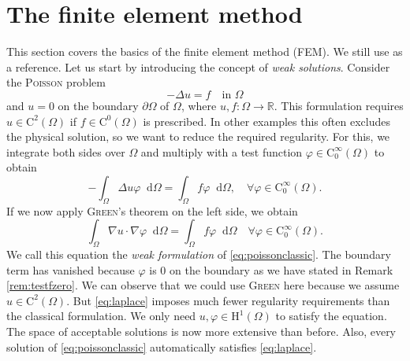 \documentclass[12pt,a4paper,twoside, open=right]{scrreprt}
\theoremstyle{definition}
\theoremstyle{plain}
\newcommand{\rr}{\mathbb{R}}
\newcommand{\D}{\mathop{}\!\mathrm{d}}
\begin{document}
\section{The finite element method}
\label{sec:fem}
This section covers the basics of the finite element method (FEM). We still use \cite{Ganesan2017} as a reference.
Let us start by introducing the concept of \emph{weak solutions}. Consider the \textsc{Poisson} problem
\begin{equation}
\label{eq:poissonclassic}
    -\Delta u = f \quad \text{in }\Omega
\end{equation}
and $u=0$ on the boundary $\partial\Omega$ of $\Omega$, where $u,f\colon \Omega\to\rr$. This formulation requires $u\in \mathrm{C}^2(\Omega)$ if $f\in\mathrm{C}^0(\Omega)$ is prescribed. In other examples this often excludes the physical solution, so we want to reduce the required regularity. For this, we integrate both sides over $\Omega$ and multiply with a test function $\varphi\in \mathrm{C}^\infty_0(\Omega)$ to obtain
\begin{equation}
    -\int_\Omega \Delta u\varphi\D\Omega =\int_\Omega f\varphi\D\Omega,\quad\forall\varphi\in\mathrm{C}^\infty_0(\Omega).
\end{equation}
If we now apply \textsc{Green}'s theorem on the left side, we obtain
\begin{equation}
    \int_\Omega \nabla u\cdot\nabla \varphi\D\Omega = \int_\Omega f\varphi\D\Omega \quad\forall\varphi\in \mathrm{C}^\infty_0(\Omega)\label{eq:laplace}.
\end{equation}
We call this equation the \emph{weak formulation} of \eqref{eq:poissonclassic}.
The boundary term has vanished because $\varphi$ is 0 on the boundary as we have stated in Remark \ref{rem:testfzero}.
We can observe that we could use \textsc{Green} here because we assume $u\in \mathrm{C}^2(\Omega)$. But \eqref{eq:laplace} imposes much fewer regularity requirements than the
classical formulation. We only need $u,\varphi\in\mathrm{H}^1(\Omega)$ to satisfy the equation. The space of acceptable solutions is now more extensive than before. Also, every solution of \eqref{eq:poissonclassic} automatically satisfies \eqref{eq:laplace}.
\end{document}
